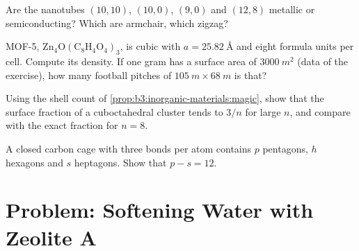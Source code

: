 \begin{exercise}[$\star\star$]\label{exo:b3:inorganic-materials:9}
Are the nanotubes $(10, 10)$, $(10, 0)$, $(9, 0)$ and $(12, 8)$ metallic or semiconducting? Which
are armchair, which zigzag?
\end{exercise}

\begin{exercise}[$\star\star\star$]\label{exo:b3:inorganic-materials:10}
MOF-5, $\mathrm{Zn_4O(C_8H_4O_4)_3}$, is cubic with $a = \qty{25.82}{\angstrom}$ and eight formula units per cell.
Compute its density. If one gram has a surface area of $\qty{3000}{m^2}$ (data of the
exercise), how many football pitches of $\qty{105}{m} \times \qty{68}{m}$ is that?
\end{exercise}

\begin{exercise}[$\star\star\star$]\label{exo:b3:inorganic-materials:11}
Using the shell count of \cref{prop:b3:inorganic-materials:magic}, show that the
surface fraction of a cuboctahedral cluster tends to $3/n$ for large $n$, and
compare with the exact fraction for $n = 8$.
\end{exercise}

\begin{exercise}[$\star\star\star$]\label{exo:b3:inorganic-materials:12}
A closed carbon cage with three bonds per atom contains $p$ pentagons, $h$ hexagons
and $s$ heptagons. Show that $p - s = 12$.
\end{exercise}

\section{Problem: Softening Water with Zeolite A}

